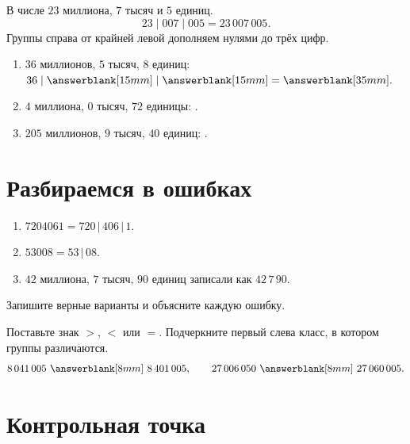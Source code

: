 \begin{problembox}
  В числе \(23\) миллиона, \(7\) тысяч и \(5\) единиц.
  \[
    23\;|\;007\;|\;005=23\,007\,005.
  \]
  Группы справа от крайней левой дополняем нулями до трёх цифр.
\end{problembox}

\begin{practicebox}
  \begin{enumerate}[label=\textbf{\arabic*.}]
    \item \(36\) миллионов, \(5\) тысяч, \(8\) единиц:
      \(36\;|\;\answerblank[15mm]\;|\;\answerblank[15mm]
      =\answerblank[35mm].\)
    \item \(4\) миллиона, \(0\) тысяч, \(72\) единицы:
      \answerblank[58mm].
    \item \(205\) миллионов, \(9\) тысяч, \(40\) единиц:
      \answerblank[58mm].
  \end{enumerate}
\end{practicebox}

\section{Разбираемся в ошибках}

\begin{warningbox}
  \begin{enumerate}[label=\textbf{\arabic*.}]
    \item \(7204061=720\,|\,406\,|\,1\).
    \item \(53008=53\,|\,08\).
    \item \(42\) миллиона, \(7\) тысяч, \(90\) единиц записали как
      \(42\,7\,90\).
  \end{enumerate}
  Запишите верные варианты и объясните каждую ошибку.
\end{warningbox}

\begin{practicebox}[3. Сравните]
  Поставьте знак \(>\), \(<\) или \(=\). Подчеркните первый слева класс, в
  котором группы различаются.
  \[
    8\,041\,005\ \answerblank[8mm]\ 8\,401\,005,
    \qquad
    27\,006\,050\ \answerblank[8mm]\ 27\,060\,005.
  \]
\end{practicebox}

\newpage
\section{Контрольная точка}

